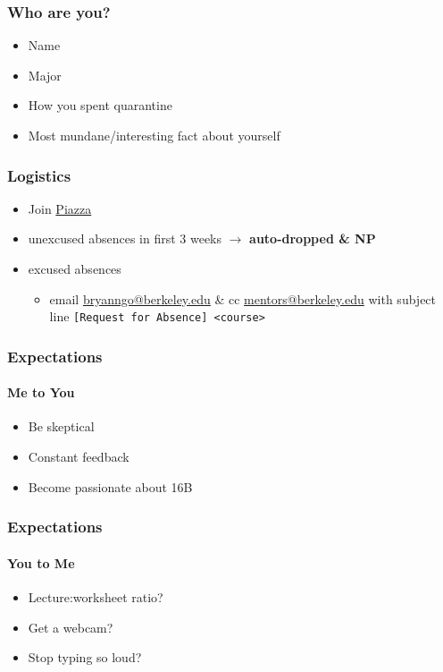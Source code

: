 \documentclass[aspectratio=169]{beamer}
\begin{document}
\begin{frame}
    \frametitle{Who are you?}

    \begin{itemize}
        \item Name
        \item Major
        \item How you spent quarantine
        \item Most mundane/interesting fact about yourself
    \end{itemize}
\end{frame}

\begin{frame}
    \frametitle{Logistics}

    \begin{itemize}
        \item Join \href{http://piazza.com/berkeley/fall2020/csm16b}{Piazza}
        \item unexcused absences in first 3 weeks \(\to\) \textbf{auto-dropped \& NP}
        \item excused absences
        \begin{itemize}
            \item email \href{mailto:bryanngo@berkeley.edu}{bryanngo@berkeley.edu} \& cc \href{mailto:mentors@berkeley.edu}{mentors@berkeley.edu} with subject line \texttt{[Request for Absence] <course>}
        \end{itemize}
    \end{itemize}
\end{frame}

\begin{frame}
    \frametitle{Expectations}
    \framesubtitle{Me to You}

    \begin{itemize}
        \item Be skeptical
        \item Constant feedback
        \item Become passionate about 16B
    \end{itemize}
\end{frame}

\begin{frame}
    \frametitle{Expectations}
    \framesubtitle{You to Me}

    \begin{itemize}
        \item Lecture:worksheet ratio?
        \item Get a webcam?
        \item Stop typing so loud?
    \end{itemize}
\end{frame}
\end{document}
